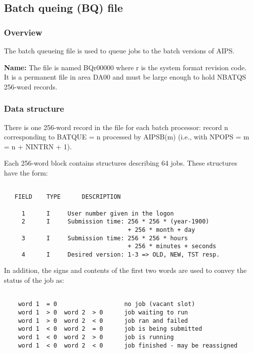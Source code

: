 \subsection{Batch queing (BQ) file}
\subsubsection{Overview}

  The batch queueing file is used to queue jobs to the batch
versions of AIPS.

{\bf Name:}  The file is named BQr00000 where r is the system format revision
code.   It is a permanent file in area DA00
and must be large enough to hold NBATQS 256-word records.

\subsubsection{Data structure}

     There is one 256-word record in the file for each batch processor:
record n corresponding to BATQUE = n  processed by AIPSB(m) (i.e.,
with NPOPS = m = n + NINTRN + 1).

     Each 256-word block contains structures describing 64 jobs.
These structures have the form:
\begin{verbatim}

   FIELD    TYPE      DESCRIPTION

     1      I     User number given in the logon
     2      I     Submission time: 256 * 256 * (year-1900)
                                   + 256 * month + day
     3      I     Submission time: 256 * 256 * hours
                                   + 256 * minutes + seconds
     4      I     Desired version: 1-3 => OLD, NEW, TST resp.
\end{verbatim}

In addition, the signs and contents of the first two words are used
to convey the status of the job as:
\begin{verbatim}

    word 1  = 0                   no job (vacant slot)
    word 1  > 0  word 2  > 0      job waiting to run
    word 1  > 0  word 2  < 0      job ran and failed
    word 1  < 0  word 2  = 0      job is being submitted
    word 1  < 0  word 2  > 0      job is running
    word 1  < 0  word 2  < 0      job finished - may be reassigned

\end{verbatim}



